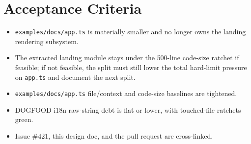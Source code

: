 \section{Acceptance Criteria}\label{record-117-acceptance-criteria}

\begin{itemize}
\tightlist
\item
  \texttt{e\allowbreak{}x\allowbreak{}a\allowbreak{}m\allowbreak{}p\allowbreak{}l\allowbreak{}e\allowbreak{}s\allowbreak{}/\allowbreak{}d\allowbreak{}o\allowbreak{}c\allowbreak{}s\allowbreak{}/\allowbreak{}a\allowbreak{}p\allowbreak{}p\allowbreak{}.\allowbreak{}t\allowbreak{}s} is materially smaller and no longer owns the landing rendering subsystem.
\item
  The extracted landing module stays under the 500-line code-size ratchet if feasible; if not feasible, the split must still lower the total hard-limit pressure on \texttt{a\allowbreak{}p\allowbreak{}p\allowbreak{}.\allowbreak{}t\allowbreak{}s} and document the next split.
\item
  \texttt{e\allowbreak{}x\allowbreak{}a\allowbreak{}m\allowbreak{}p\allowbreak{}l\allowbreak{}e\allowbreak{}s\allowbreak{}/\allowbreak{}d\allowbreak{}o\allowbreak{}c\allowbreak{}s\allowbreak{}/\allowbreak{}a\allowbreak{}p\allowbreak{}p\allowbreak{}.\allowbreak{}t\allowbreak{}s} file/context and code-size baselines are tightened.
\item
  DOGFOOD i18n raw-string debt is flat or lower, with touched-file ratchets green.
\item
  Issue \#421, this design doc, and the pull request are cross-linked.
\end{itemize}

